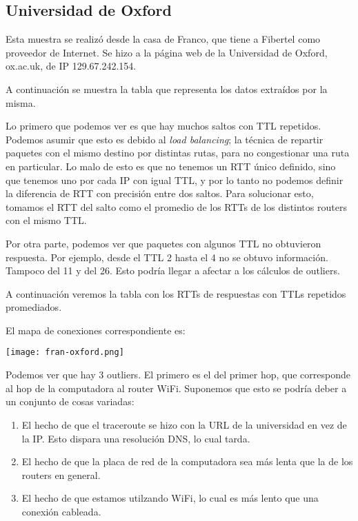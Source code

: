\subsection{Universidad de Oxford}
Esta muestra se realizó desde la casa de Franco, que tiene a Fibertel 
como proveedor de Internet. Se hizo a la página web de la Universidad de Oxford,
ox.ac.uk, de IP 129.67.242.154. 

A continuación se muestra la tabla que representa los datos extraídos por la
misma.



Lo primero que podemos ver es que hay muchos saltos con TTL repetidos. Podemos
asumir que esto es debido al \emph{load balancing}; la técnica de repartir
paquetes con el mismo destino por distintas rutas, para no congestionar una
ruta en particular. Lo malo de esto es que no tenemos un RTT único definido,
sino que tenemos uno por cada IP con igual TTL, y por lo tanto no podemos
definir la diferencia de RTT con precisión entre dos saltos.
Para solucionar esto, tomamos el RTT del salto como el promedio de los RTTs
de los distintos routers con el mismo TTL.

Por otra parte, podemos ver que paquetes con algunos TTL no obtuvieron
respuesta. Por ejemplo, desde el TTL 2 hasta el 4 no se obtuvo información. 
Tampoco del 11 y del 26. Esto podría llegar a afectar a los cálculos de outliers.

A continuación veremos la tabla con los RTTs de respuestas con TTLs repetidos
promediados.



El mapa de conexiones correspondiente es:

\begin{center}
    \texttt{[image: fran-oxford.png]}
\end{center}
    

Podemos ver que hay 3 outliers. El primero es el del primer hop, que corresponde
al hop de la computadora al router WiFi. Suponemos que esto se podría deber a
un conjunto de cosas variadas:
\begin{enumerate}
\item El hecho de que el traceroute se hizo con la URL de la universidad en vez de 
la IP. Esto dispara una resolución DNS, lo cual tarda.
\item El hecho de que la placa de red de la computadora sea más lenta
que la de los routers en general.
\item El hecho de que estamos utilzando WiFi, lo cual es más lento que una conexión
cableada.
\end{enumerate}

